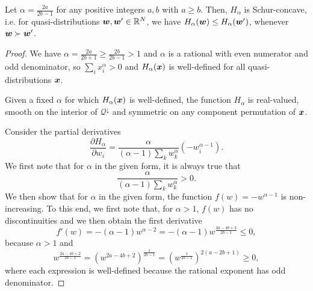 \documentclass[pra,
aps,
twocolumn,
superscriptaddress,
groupedaddress,
nofootinbib,
reprint
]{revtex4-1}
\begin{document}
\begin{theorem}\label{thm:HSchur}
	Let $\alpha = \frac{2a}{2b-1}$ for any positive integers $a,b$ with $a \geq b$.
	Then, $H_\alpha$ is Schur-concave, i.e. for quasi-distributions $\boldsymbol{w}, \boldsymbol{w}' \in \mathbb{R}^N$, we have $H_\alpha(\boldsymbol{w}) \leq H_\alpha(\boldsymbol{w}')$, whenever $\boldsymbol{w} \succ \boldsymbol{w}'$.
\end{theorem}
\begin{proof}
We have $\alpha = \frac{2a}{2b+1} \geq \frac{2b}{2b-1} > 1$ and $\alpha$ is a rational with even numerator and odd denominator, so $\sum_i x_i^\alpha > 0$ and $H_\alpha(\boldsymbol{x})$ is well-defined for all quasi-distributions $\boldsymbol{x}$.

Given a fixed $\alpha$ for which $H_\alpha(\boldsymbol{x})$ is well-defined, the function $H_\alpha$ is real-valued, smooth on the interior of $\mathcal{Q}^\downarrow$ and symmetric on any component permutation of $\boldsymbol{x}$.

Consider the partial derivatives
\begin{equation}
	\frac{\partial H_\alpha}{\partial w_i} = \frac{\alpha}{(\alpha-1)\sum_k{w_k^\alpha}}(-w_i^{\alpha-1}).
\end{equation}
We first note that for $\alpha$ in the given form, it is always true that
\begin{equation}
	\frac{\alpha}{(\alpha-1)\sum_k{w_k^\alpha}} > 0.
\end{equation}
We then show that for $\alpha$ in the given form, the function $f(w) = -w^{\alpha - 1}$ is non-increasing.
To this end, we first note that, for $\alpha > 1$, $f(w)$ has no discontinuities and we then obtain the first derivative
\begin{equation}
	f'(w) = -(\alpha - 1) w^{\alpha-2} = -(\alpha - 1)w^{\frac{2a-4b+2}{2b-1}} \leq 0,
\end{equation}
because $\alpha > 1$ and
\begin{equation}
	w^{\frac{2a-4b+2}{2b-1}} = \left(w^{2a-4b+2}\right)^{\frac{1}{2b-1}} = \left(w^{\frac{1}{2b-1}}\right)^{2(a-2b+1)} \geq 0,
\end{equation}
where each expression is well-defined because the rational exponent has odd denominator.

\end{proof}
\end{document}
